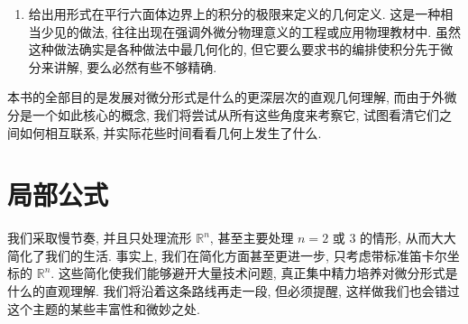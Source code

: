 \begin{enumerate}
  注意这个公式完全用 1-形式 $\alpha$ 和向量 $v$、$w$ 来书写. 在这个公式的任何地方, 你正在使用的特定坐标（前一个公式中的 $x_i$）都不出现. 这种公式有时被称为坐标无关公式、整体公式或不变公式. 如果 $\alpha$ 是任意的 $k$-形式, $v_0,\ldots,v_k$ 是 $k+1$ 个向量场, 那么整体公式为
  \[
  \begin{aligned}
  d\alpha(v_0,\ldots,v_k)&=\sum_{i}(-1)^i\,v_i[\alpha(v_0,\ldots,\widehat{v_i},\ldots,v_k)]\\
  &\qquad+\sum_{i<j}(-1)^{i+j}\,\alpha\bigl([v_i,v_j],v_0,\ldots,\widehat{v_i},\ldots,\widehat{v_j},\ldots,v_k\bigr).
  \end{aligned}
  \]
  向量上的帽子表示该向量被省略. 再次注意, 这个公式完全用 $k$-形式 $\alpha$ 和向量场书写. 它看起来也相当复杂, 远不如坐标内公式那么简洁.
  \item 给出用形式在平行六面体边界上的积分的极限来定义的几何定义. 这是一种相当少见的做法, 往往出现在强调外微分物理意义的工程或应用物理教材中. 虽然这种做法确实是各种做法中最几何化的, 但它要么要求书的编排使积分先于微分来讲解, 要么必然有些不够精确.
\end{enumerate}

本书的全部目的是发展对微分形式是什么的更深层次的直观几何理解, 而由于外微分是一个如此核心的概念, 我们将尝试从所有这些角度来考察它, 试图看清它们之间如何相互联系, 并实际花些时间看看几何上发生了什么.

\section{局部公式}

我们采取慢节奏, 并且只处理流形 $\mathbb{R}^n$, 甚至主要处理 $n=2$ 或 $3$ 的情形, 从而大大简化了我们的生活. 事实上, 我们在简化方面甚至更进一步, 只考虑带标准笛卡尔坐标的 $\mathbb{R}^n$. 这些简化使我们能够避开大量技术问题, 真正集中精力培养对微分形式是什么的直观理解. 我们将沿着这条路线再走一段, 但必须提醒, 这样做我们也会错过这个主题的某些丰富性和微妙之处.


